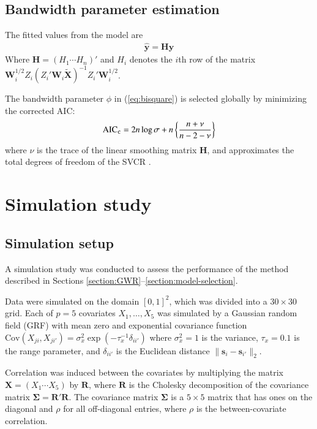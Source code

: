\documentclass[authoryear, review, 11pt]{elsarticle}
\begin{document}
	\subsection{Bandwidth parameter estimation}
		The fitted values from the model are	
	\begin{align}
		\hat{\bm{y}} = \bm{H} \bm{y}
	\end{align}
	Where $\bm{H} = \left(H_1 \cdots H_n \right)'$ and $H_i$ denotes the $i$th row of the matrix $\bm{W}_i^{1/2} Z_i \left( Z_i'\bm{W}_i \tilde{\bm{X}} \right)^{-1} Z_i'\bm{W}_i^{1/2}$.
	
	The bandwidth parameter $\phi$ in (\ref{eq:bisquare}) is selected globally by minimizing the corrected AIC:	
	\begin{align}\label{eq:AICc}
		\text{AIC}_{\tt c} = 2 n \log{\sigma} + n \left\{\frac{n + \nu}{n - 2 - \nu}\right\}
	\end{align}	
	where $\nu$ is the trace of the linear smoothing matrix $\bm{H}$, and approximates the total degrees of freedom of the SVCR \citep{Hurvich:1998}.


\section{Simulation study \label{section:simulation}}
	\subsection{Simulation setup}
	A simulation study was conducted to assess the performance of the method described in Sections \ref{section:GWR}--\ref{section:model-selection}. 
	
	Data were simulated on the domain $[0,1]^2$, which was divided into a $30 \times 30$ grid. Each of $p=5$ covariates $X_1, \dots, X_5$ was simulated by a Gaussian random field (GRF) with mean zero and exponential covariance function $\text{Cov} \left(X_{ji}, X_{ji'} \right) = \sigma_x^2 \exp{\left( -\tau_x^{-1} \delta_{ii'} \right)}$ where $\sigma_x^2=1$ is the variance, $\tau_x = 0.1$ is the range parameter, and $\delta_{ii'}$ is the Euclidean distance $\|\bm{s}_i - \bm{s}_{i'}\|_2$.
	
	Correlation was induced between the covariates by multiplying the matrix $\bm{X} = \left(X_1 \cdots X_5\right)$ by $\bm{R}$, where $\bm{R}$ is the Cholesky decomposition of the covariance matrix $\bm{\Sigma} = \bm{R}'\bm{R}$. The covariance matrix $\bm{\Sigma}$ is a $5 \times 5$ matrix that has ones on the diagonal and $\rho$ for all off-diagonal entries, where $\rho$ is the between-covariate correlation.
		
\end{document}
